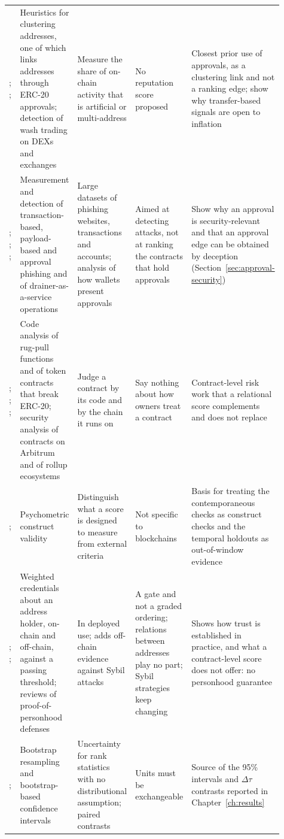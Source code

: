 {\begin{longtable}{p{0.15\linewidth}p{0.20\linewidth}p{0.19\linewidth}p{0.19\linewidth}p{0.18\linewidth}}
\textcite{victor2020clustering}; \textcite{victor2021washtrading}; \textcite{cong2023washtrading} & Heuristics for clustering addresses, one of which links addresses through ERC-20 approvals; detection of wash trading on DEXs and exchanges & Measure the share of on-chain activity that is artificial or multi-address & No reputation score proposed & Closest prior use of approvals, as a clustering link and not a ranking edge; show why transfer-based signals are open to inflation \\
\textcite{he2023txphishscope}; \textcite{chen2025payload}; \textcite{he2025drainer}; \textcite{adamczyk2025approval} & Measurement and detection of transaction-based, payload-based and approval phishing and of drainer-as-a-service operations & Large datasets of phishing websites, transactions and accounts; analysis of how wallets present approvals & Aimed at detecting attacks, not at ranking the contracts that hold approvals & Show why an approval is security-relevant and that an approval edge can be obtained by deception (Section~\ref{sec:approval-security}) \\
\textcite{lin2024crpwarner}; \textcite{li2026erc20risk}; \textcite{tang2024arbitrum}; \textcite{efimov2026rollup} & Code analysis of rug-pull functions and of token contracts that break ERC-20; security analysis of contracts on Arbitrum and of rollup ecosystems & Judge a contract by its code and by the chain it runs on & Say nothing about how owners treat a contract & Contract-level risk work that a relational score complements and does not replace \\
\textcite{cronbach1955construct}; \textcite{messick1995validity} & Psychometric construct validity & Distinguish what a score is designed to measure from external criteria & Not specific to blockchains & Basis for treating the contemporaneous checks as construct checks and the temporal holdouts as out-of-window evidence \\
\textcite{humanpassportnddocs}; \textcite{siddarth2020watchmen}; \textcite{bordeianu2026sybil} & Weighted credentials about an address holder, on-chain and off-chain, against a passing threshold; reviews of proof-of-personhood defenses & In deployed use; adds off-chain evidence against Sybil attacks & A gate and not a graded ordering; relations between addresses play no part; Sybil strategies keep changing & Shows how trust is established in practice, and what a contract-level score does not offer: no personhood guarantee \\
\textcite{efron1979bootstrap}; \textcite{diciccio1996bootstrap} & Bootstrap resampling and bootstrap-based confidence intervals & Uncertainty for rank statistics with no distributional assumption; paired contrasts & Units must be exchangeable & Source of the 95\% intervals and $\Delta\tau$ contrasts reported in Chapter~\ref{ch:results} \\
\end{longtable}
}

